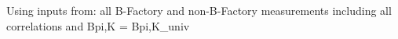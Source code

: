 \noindent Using inputs from: all B-Factory and non-B-Factory measurements including all correlations and B{pi,K} = B{pi,K}\_univ
